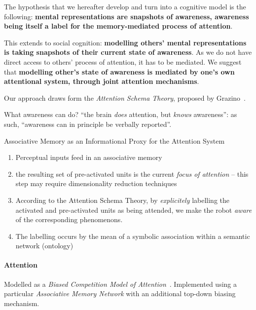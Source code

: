 \documentclass[a4paper]{article}
\begin{document}
The hypothesis that we hereafter develop and turn into a cognitive model is the
following: \textbf{mental representations are snapshots of awareness, awareness being
itself a label for the memory-mediated process of attention}.

This extends to social cognition: \textbf{modelling others' mental representations is
taking snapshots of their current state of awareness}. As we do not have direct
access to others' process of attention, it has to be mediated. We suggest that
\textbf{modelling other's state of awareness is mediated by one's own
attentional system, through joint attention mechanisms}.


Our approach draws form the \emph{Attention Schema Theory}, proposed by
Grazino~\cite{graziano2013consciousness}.

What awareness can do? ``the brain \emph{does} attention, but \emph{knows}
awareness'': as such, ``awareness can in principle be verbally reported''.



Associative Memory as an Informational Proxy for the Attention System


\begin{enumerate}
    \item Perceptual inputs feed in an associative memory

    \item the resulting set of pre-activated units is the current
        \emph{focus of attention} -- this step may require dimensionality
        reduction techniques

    \item According to the Attention Schema Theory, by \emph{explicitely}
        labelling the activated and pre-activated units as being attended, we
        make the robot \emph{aware} of the corresponding phenomenons.

    \item The labelling occurs by the mean of a symbolic association within a
        semantic network (ontology)

\end{enumerate}

\paragraph{Attention}

Modelled as a \emph{Biased Competition Model of
Attention}~\cite{desimone1995neural}.
Implemented using a particular \emph{Associative Memory Network} with an
additional top-down biasing mechanism.
\end{document}
